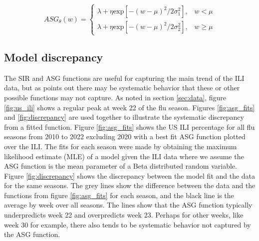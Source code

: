 \documentclass[ba]{imsart}
\theoremstyle{plain}
\theoremstyle{definition}
\theoremstyle{remark}
\begin{document}
\begin{equation}
    \label{eq:asg_function_rep}
    ASG_{\theta}(w) = 
    \begin{cases}
        \lambda + \eta \text{exp}[-(w - \mu)^2/2\sigma^2_1], \;\;\; w < \mu \\
        \lambda + \eta \text{exp}[-(w - \mu)^2/2\sigma^2_2], \;\;\; w \geq \mu
    \end{cases}
\end{equation}



\subsection{Model discrepancy}


The SIR and ASG functions are useful for capturing the main trend of the ILI data, but as \cite{osthus2019dynamic} points out there may be systematic behavior that these or other possible functions may not capture. As noted in section \ref{sec:data}, figure \ref{fig:us_ili} shows a regular peak at week 22 of the flu season. 
Figures \ref{fig:asg_fits} and \ref{fig:discrepancy} are used together to illustrate the systematic discrepancy from a fitted function. Figure \ref{fig:asg_fits} shows the US ILI percentage for all flu seasons from 2010 to 2022 excluding 2020 with a best fit ASG function plotted over the ILI. The fits for each season were made by obtaining the maximum likelihood estimate (MLE) of a model given the ILI data where we assume the ASG function is the mean parameter of a Beta distributed random variable. Figure \ref{fig:discrepancy} shows the discrepancy between the model fit and the data for the same seasons. The grey lines show the difference between the data and the functions from figure \ref{fig:asg_fits} for each season, and the black line is the average by week over all seasons. The lines show that the ASG function typically underpredicts week 22 and overpredicts week 23. Perhaps for other weeks, like week 30 for example, there also tends to be systematic behavior not captured by the ASG function.
\end{document}
